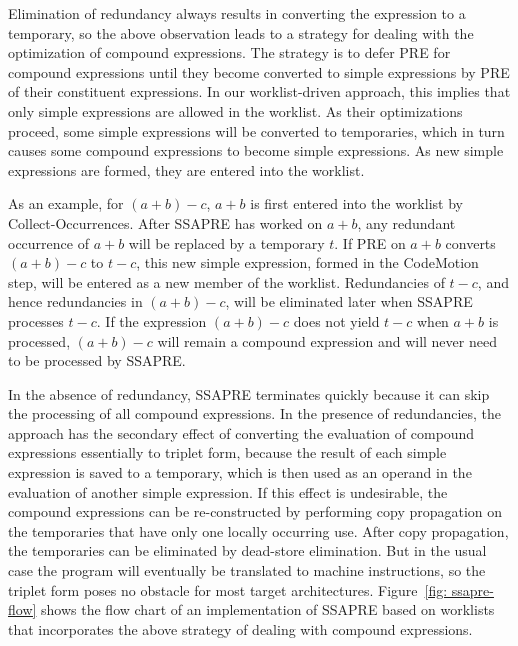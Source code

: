 Elimination of redundancy always results in converting the expression to a
temporary, so the above observation leads to a strategy for dealing with
the optimization of compound expressions.  The strategy is to defer PRE for
compound expressions until they become converted to simple expressions by
PRE of their constituent expressions.  In our worklist-driven approach,
this implies that only simple expressions are allowed in the worklist.
As their optimizations proceed, some simple expressions will be converted to
temporaries, which in turn causes some compound expressions to become
simple expressions.  As new simple expressions are formed, they are entered
into the worklist.

As an example, for $(a+b)-c$, $a+b$ is first entered into the worklist by
Collect-Occurrences.  After SSAPRE has worked on $a+b$, any redundant occurrence
of $a+b$ will be replaced by a temporary $t$.  If PRE on $a+b$ converts
$(a+b)-c$ to $t-c$, this new simple expression, formed in the CodeMotion step,
will be entered as a new member of the worklist.  Redundancies of $t-c$, and
hence redundancies in $(a+b)-c$, will be eliminated later when SSAPRE
processes $t-c$.  If the expression $(a+b)-c$ does not yield $t-c$ when $a+b$
is processed, $(a+b)-c$ will remain a compound expression and will never need
to be processed by SSAPRE.

In the absence of redundancy, SSAPRE terminates quickly because it can skip
the processing of all compound expressions.  In the presence of redundancies,
the approach has the secondary effect of converting the evaluation of compound
expressions essentially to triplet form, because the result of each simple
expression is saved to a temporary, which is then used as an operand in the
evaluation of another simple expression.  If this effect is undesirable,
the compound expressions can be re-constructed by performing copy propagation
on the temporaries that have only one locally occurring use.  After copy
propagation, the temporaries can be eliminated by dead-store elimination.  But
in the usual case the program will eventually be translated to machine
instructions, so the triplet form poses no obstacle for most target 
architectures.  Figure~\ref{fig: ssapre-flow} shows the flow chart of an
implementation of SSAPRE based on worklists that incorporates the above
strategy of dealing with compound expressions.

